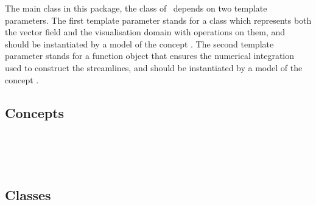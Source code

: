 The main class in this package, the  class of \cgal\ depends on two template
parameters.  The first template parameter stands for a class which
represents both the vector field and the visualisation domain with
operations on them, and should be instantiated by a model of the concept
.  The second template parameter stands for a
function object that ensures the numerical integration used to
construct the streamlines, and should be instantiated by a model of the concept
.

\subsection*{Concepts}
 \\
 \\
 \\

\subsection*{Classes}


\\
\\
\\
\\
\\


